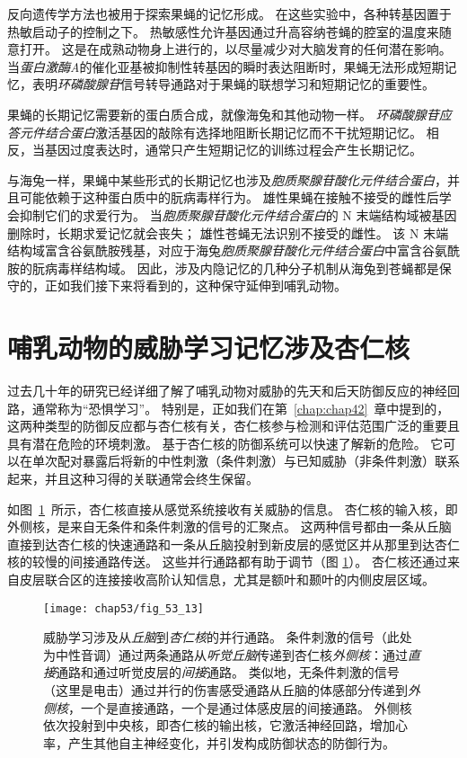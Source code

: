 反向遗传学方法也被用于探索果蝇的记忆形成。
在这些实验中，各种转基因置于热敏启动子的控制之下。
热敏感性允许基因通过升高容纳苍蝇的腔室的温度来随意打开。
这是在成熟动物身上进行的，以尽量减少对大脑发育的任何潜在影响。
当\textit{蛋白激酶A}的催化亚基被抑制性转基因的瞬时表达阻断时，果蝇无法形成短期记忆，表明\textit{环磷酸腺苷}信号转导通路对于果蝇的联想学习和短期记忆的重要性。


果蝇的长期记忆需要新的蛋白质合成，就像海兔和其他动物一样。
\textit{环磷酸腺苷应答元件结合蛋白}激活基因的敲除有选择地阻断长期记忆而不干扰短期记忆。
相反，当基因过度表达时，通常只产生短期记忆的训练过程会产生长期记忆。


与海兔一样，果蝇中某些形式的长期记忆也涉及\textit{胞质聚腺苷酸化元件结合蛋白}，并且可能依赖于这种蛋白质中的朊病毒样行为。
雄性果蝇在接触不接受的雌性后学会抑制它们的求爱行为。
当\textit{胞质聚腺苷酸化元件结合蛋白}的 N 末端结构域被基因删除时，长期求爱记忆就会丧失；
雄性苍蝇无法识别不接受的雌性。
该 N 末端结构域富含谷氨酰胺残基，对应于海兔\textit{胞质聚腺苷酸化元件结合蛋白}中富含谷氨酰胺的朊病毒样结构域。
因此，涉及内隐记忆的几种分子机制从海兔到苍蝇都是保守的，正如我们接下来将看到的，这种保守延伸到哺乳动物。



\section{哺乳动物的威胁学习记忆涉及杏仁核}

过去几十年的研究已经详细了解了哺乳动物对威胁的先天和后天防御反应的神经回路，通常称为“恐惧学习”。
特别是，正如我们在第~\ref{chap:chap42}~章中提到的，这两种类型的防御反应都与杏仁核有关，杏仁核参与检测和评估范围广泛的重要且具有潜在危险的环境刺激。
基于杏仁核的防御系统可以快速了解新的危险。
它可以在单次配对暴露后将新的中性刺激（条件刺激）与已知威胁（非条件刺激）联系起来，并且这种习得的关联通常会终生保留。


如图~\ref{fig:53_13}~所示，杏仁核直接从感觉系统接收有关威胁的信息。
杏仁核的输入核，即外侧核，是来自无条件和条件刺激的信号的汇聚点。
这两种信号都由一条从丘脑直接到达杏仁核的快速通路和一条从丘脑投射到新皮层的感觉区并从那里到达杏仁核的较慢的间接通路传送。
这些并行通路都有助于调节（图 \ref{fig:53_13}）。
杏仁核还通过来自皮层联合区的连接接收高阶认知信息，尤其是额叶和颞叶的内侧皮层区域。


\begin{figure}[htbp]
	\centering
	\texttt{[image: chap53/fig\_53\_13]}
	\caption{威胁学习涉及从\textit{丘脑}到\textit{杏仁核}的并行通路。
		条件刺激的信号（此处为中性音调）通过两条通路从\textit{听觉丘脑}传递到杏仁核\textit{外侧核}：通过\textit{直接}通路和通过听觉皮层的\textit{间接}通路。
		类似地，无条件刺激的信号（这里是电击）通过并行的伤害感受通路从丘脑的体感部分传递到\textit{外侧核}，一个是直接通路，一个是通过体感皮层的间接通路。
		外侧核依次投射到中央核，即杏仁核的输出核，它激活神经回路，增加心率，产生其他自主神经变化，并引发构成防御状态的防御行为\cite{kandel2007search}。}
	\label{fig:53_13}
\end{figure}


